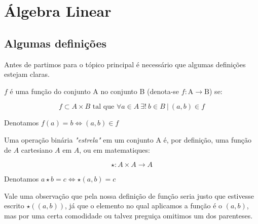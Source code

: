 
\chapter{Álgebra Linear}

\section{Algumas definições}

Antes de partimos para o tópico principal é necessário que algumas definições estejam claras.

\begin{defn}


$f$ é uma função do conjunto A no conjunto B (denota-se $f: \text{A} \to \text{B}$) se:

\[f \subset A \times B \text{ tal que } \forall a \in A \ \exists ! \ b \in B \ | \ (a,b) \in f \]

Denotamos $f(a) = b \iff (a,b) \in f$
\end{defn}


\begin{defn}




Uma operação binária \emph{"estrela"} em um conjunto A é, por definição, uma função de $A$ cartesiano $A$ em $A$, ou em matematiques:

\[ \star : A \times A \to A \]

Denotamos $a \star b = c \iff \star(a,b) = c$

Vale uma observação que pela nossa definição de função seria justo que estivesse escrito $\star((a,b))$, já que o elemento no qual aplicamos a função é o $(a,b)$, mas por uma certa comodidade ou talvez preguiça omitimos um dos parenteses. 

\end{defn}

